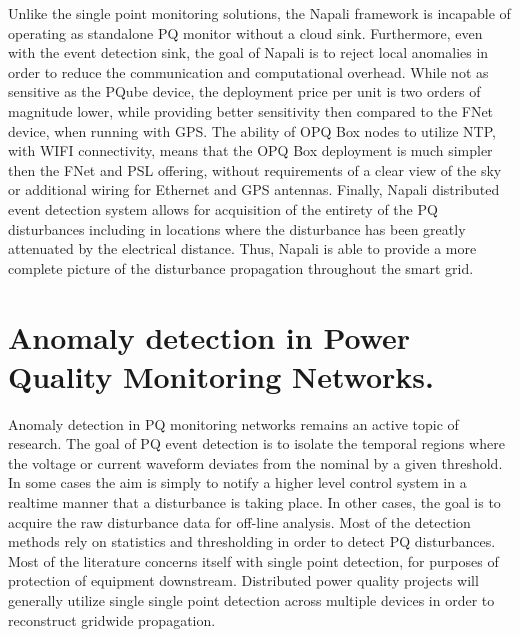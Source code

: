 Unlike the single point monitoring solutions, the Napali framework is incapable of operating as standalone PQ monitor without a cloud sink.
Furthermore, even with the event detection sink, the goal of Napali is to reject local anomalies in order to reduce the communication and computational overhead.
While not as sensitive as the PQube device, the deployment price per unit is two orders of magnitude lower, while providing better sensitivity then compared to the FNet device, when running with GPS.
The ability of OPQ Box nodes to utilize NTP, with WIFI connectivity, means that the OPQ Box deployment is much simpler then the FNet and PSL offering, without requirements of a clear view of the sky or additional wiring for Ethernet and GPS antennas.
Finally, Napali distributed event detection system allows for acquisition of the entirety of the PQ disturbances including in locations where the disturbance has been greatly attenuated by the electrical distance.
Thus, Napali is able to provide a more complete picture of the disturbance propagation throughout the smart grid.

\section{Anomaly detection in Power Quality Monitoring Networks.}\label{sec:anomaly-detection-in-power-quality-monitoring-networks.}

Anomaly detection in PQ monitoring networks remains an active topic of research.
The goal of PQ event detection is to isolate the temporal regions where the voltage or current waveform deviates from the nominal by a given threshold.
In some cases the aim is simply to notify a higher level control system in a realtime manner that a disturbance is taking place.
In other cases, the goal is to acquire the raw disturbance data for off-line analysis.
Most of the detection methods rely on statistics and thresholding in order to detect PQ disturbances.
Most of the literature concerns itself with single point detection, for purposes of protection of equipment downstream.\cite{gu2004statistical}\cite{karimi2000wavelet} \cite{shin2006power} Distributed power quality projects will generally utilize single single point detection across multiple devices in order to reconstruct gridwide propagation.\cite{von2014micro}

